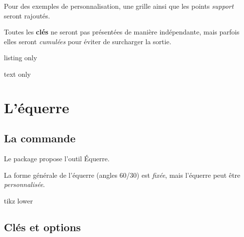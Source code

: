 \documentclass[french,a4paper,11pt]{article}
\newcommand\Cle[1]{{\bfseries\sffamily\textlangle #1\textrangle}}
\newcommand\affichegrille[4]{%
	\draw[xstep=1,ystep=1,lightgray] (#1,#3) grid (#2,#4) ;
	\foreach \x in {#1,\inteval{1+#1},...,#2} \draw[lightgray] (\x,#4)--++(0,3pt) node[font=\scriptsize,above] {$\x$} ;
	\foreach \y in {#3,\inteval{1+#3},...,#4} \draw[lightgray] (#1,\y)--++(-3pt,0) node[font=\scriptsize,left] {$\y$} ;
}
\newcommand\pointsutiles[1]{%
	\foreach \point in {#1} {\draw[thick,fill=red] \point circle[radius=3pt] ;}
}
\begin{document}
\begin{noteblock}
Pour des exemples de personnalisation, une grille ainsi que les points \textit{support} seront rajoutés.

\smallskip

Toutes les \Cle{clés} ne seront pas présentées de manière indépendante, mais parfois elles seront \textit{cumulées} pour éviter de surcharger la sortie.
\end{noteblock}

\begin{PresentationCode}{listing only}
\tkzRegle[Fond,CouleurFond=red]
\tkzRegle[Longueur=13,Largeur=2,Rotation=-45,Couleur=ForestGreen, Origine={(1,-3)},Fond,PosVal=hb]
\tkzRegle[Largeur=1.25,Longueur=9,Couleur=blue,Rotation=20,Origine={(0,3)}, AfficheValeurs=false]
\end{PresentationCode}

\begin{PresentationCode}{text only}
\end{PresentationCode}

\pagebreak

\section{L'équerre}

\subsection{La commande}

\begin{cautionblock}
Le package propose l'outil \textsf{Équerre}.

La forme générale de l'équerre (angles 60/30) est \textit{fixée}, mais l'équerre peut être \textit{personnalisée}.
\end{cautionblock}

\begin{PresentationCode}{tikz lower}
\tkzEquerre
\end{PresentationCode}

\subsection{Clés et options}
\end{document}
